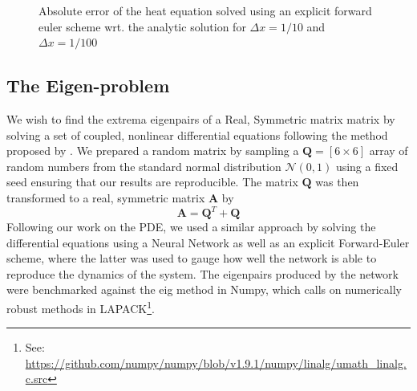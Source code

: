 \documentclass[reprint, english, nofootinbib]{revtex4-2}
\begin{document}
\begin{figure}[h!tb]
    \caption{\label{fig:fw euler PDE error}Absolute error of the heat equation solved using an explicit forward euler scheme wrt. the analytic solution for $\Delta x = 1/10$ and $\Delta x = 1/100$}
\end{figure}

\subsection{The Eigen-problem}
\noindent 
We wish to find the extrema eigenpairs of a Real, Symmetric matrix matrix by solving a set of coupled, nonlinear differential equations following the method proposed by \textcite{Yi_2004}. We prepared a random matrix by sampling a $\mathbf Q= [6\times 6]$ array of random numbers from the standard normal distribution $\mathcal N(0, 1)$ using a fixed seed ensuring that our results are reproducible. The matrix $\mathbf Q$ was then transformed to a real, symmetric matrix $\mathbf A$ by
\begin{equation}
    \mathbf A = \mathbf Q^T + \mathbf Q
\end{equation}
Following our work on the PDE, we used a similar approach by solving the differential equations using a Neural Network as well as an explicit Forward-Euler scheme, where the latter was used to gauge how well the network is able to reproduce the dynamics of the system. The eigenpairs produced by the network were benchmarked against the eig method in Numpy, which calls on numerically robust methods in LAPACK\footnote{See: \url{https://github.com/numpy/numpy/blob/v1.9.1/numpy/linalg/umath_linalg.c.src}}.
\end{document}

